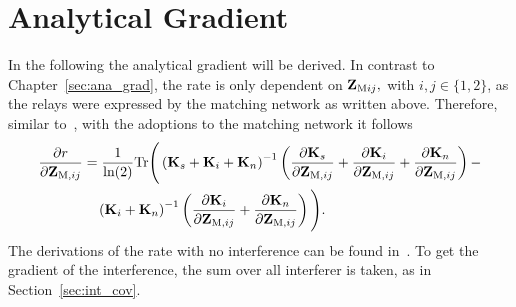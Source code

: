 \section{Analytical Gradient}
In the following the analytical gradient will be derived.
In contrast to Chapter~\ref{sec:ana_grad}, the rate is only dependent on $\mathbf{Z}_{\text{M}ij},$ with $i,j\in\{1,2\}$, as the relays were expressed by the matching network as written above.
Therefore, similar to~\cite{Yahia2013}, with the adoptions to the matching network it follows
\begin{align}
\label{eq:gradient}\nonumber
\frac{\partial r}{\partial\mathbf{Z}_{\text{M},ij}} &= \frac{1}{\text{ln}(2)} 
\text{Tr}\Bigg(\left(\mathbf{K}_s + \mathbf{K}_i + \mathbf{K}_n\right)^{-1}
\left(\frac{\partial\mathbf{K}_s}{\partial\mathbf{Z}_{\text{M},ij}}+
 \frac{\partial\mathbf{K}_i}{\partial\mathbf{Z}_{\text{M},ij}}+
 \frac{\partial\mathbf{K}_n}{\partial\mathbf{Z}_{\text{M},ij}}\right)-\\
 &\quad\left(\mathbf{K}_i+\mathbf{K}_n\right)^{-1}
 \left(\frac{\partial\mathbf{K}_i}{\partial\mathbf{Z}_{\text{M},ij}}+
 	\frac{\partial\mathbf{K}_n}{\partial\mathbf{Z}_{\text{M},ij}}\right)\Bigg).
\end{align}
The derivations of the rate with no interference can be found in~\cite{Yahia2013}.
To get the gradient of the interference, the sum over all interferer is taken, as in Section~\ref{sec:int_cov}.





